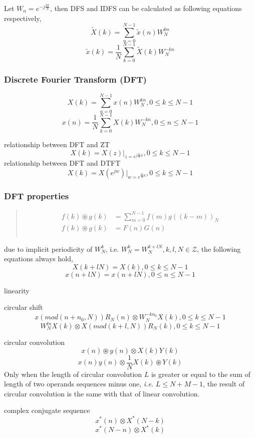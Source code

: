Let $W_n = e^{-j\frac{2\pi}{N}}$, then DFS and IDFS can be calculated
as following equations respectively,
\[ \tilde{X}(k) = \sum_{n=0}^{N-1} \tilde{x}(n)W_N^{kn} \]
\[ \tilde{x}(k) = \frac{1}{N} \sum_{k=0}^{N-1} \tilde{X}(k)W_N^{-kn} \]

 \subsubsection{Discrete Fourier Transform (DFT)}

\[ X(k) = \sum_{n=0}^{N-1} x(n)W_N^{kn}, 0\leq k\leq N-1 \]
\[ x(n) = \frac{1}{N} \sum_{k=0}^{N-1} X(k)W_N^{-kn}, 0\leq n\leq N-1 \]

relationship between DFT and ZT
\[ X(k) = X(z)|_{z=e^{j\frac{2\pi}{N}k}}, 0\leq k\leq N-1 \]
relationship between DFT and DTFT
\[ X(k) = X(e^{jw})|_{w=e^{\frac{2\pi}{N}k}}, 0\leq k\leq N-1 \]

\subsubsection{DFT properties}

 \begin{quote}
  \begin{align*}
   f(k)\circledast g(k) &= \sum_{m=0}^{N-1} f(m)g((k-m))_N \\
   f(k)\circledast g(k) &= F(n)G(n) \\
  \end{align*}
 \end{quote}

due to implicit periodicity of $W_N^k$, i.e.
$W_N^k = W_N^{k+lN}, k,l,N\in \mathcal{Z}$,
the following equations always hold,
\[ X(k+lN) = X(k), 0\leq k\leq N-1\]
\[ x(n+lN) = x(n+lN), 0\leq n\leq N-1\]

linearity

circular shift
\[ x(mod(n+n_0, N))R_N(n) \otimes W_N^{-kn_0} X(k), 0\leq k\leq N-1\]
\[ W_N^{ln} X(k) \otimes X(mod(k+l, N))R_N(k),  0\leq k\leq N-1\]

circular convolution
\[ x(n) \circledast y(n) \otimes X(k)Y(k)\]
\[ x(n)y(n) \otimes \frac{1}{N} X(k)\circledast Y(k)\]
Only when the length of circular convolution $L$ is greater or equal
to the sum of length of two operands sequences minus one, \emph{i.e.}
$L\leqslant N+M-1$, the result of circular convolution is the same
with that of linear convolution.

complex conjugate sequence
\[ x^*(n) \otimes X^*(N-k) \]
\[ x^*(N-n) \otimes X^*(k) \]

